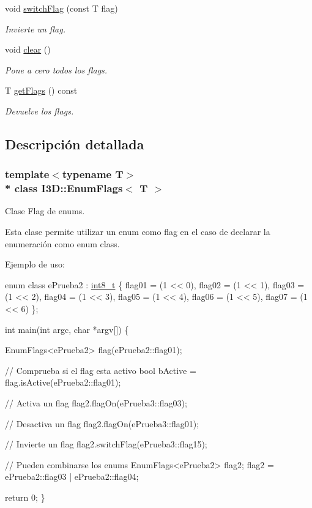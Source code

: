 \begin{DoxyCompactItemize}
void \hyperlink{class_i3_d_1_1_enum_flags_a8c834dc5942c140073152e281a86c71b}{switch\+Flag} (const T flag)
\begin{DoxyCompactList}\small\item\em Invierte un flag. \end{DoxyCompactList}\item 
void \hyperlink{class_i3_d_1_1_enum_flags_a1ed0ec6afaf6164c540f750329859bb6}{clear} ()
\begin{DoxyCompactList}\small\item\em Pone a cero todos los flags. \end{DoxyCompactList}\item 
T \hyperlink{class_i3_d_1_1_enum_flags_a6be92f1e3a8b65a3eaadfb729d1e3f77}{get\+Flags} () const 
\begin{DoxyCompactList}\small\item\em Devuelve los flags. \end{DoxyCompactList}\end{DoxyCompactItemize}


\subsection{Descripción detallada}
\subsubsection*{template$<$typename T$>$\\*
class I3\+D\+::\+Enum\+Flags$<$ T $>$}

Clase Flag de enums. 

Esta clase permite utilizar un enum como flag en el caso de declarar la enumeración como \textquotesingle{}enum class\textquotesingle{}.

Ejemplo de uso\+: 
\begin{DoxyCode}
\textcolor{keyword}{enum class} ePrueba2 : \hyperlink{defs_8h_aef44329758059c91c76d334e8fc09700}{int8\_t} \{
 flag01 = (1 << 0),
 flag02 = (1 << 1),
 flag03 = (1 << 2),
 flag04 = (1 << 3),
 flag05 = (1 << 4),
 flag06 = (1 << 5),
 flag07 = (1 << 6)
\};

\textcolor{keywordtype}{int} main(\textcolor{keywordtype}{int} argc, \textcolor{keywordtype}{char} *argv[])
\{

  EnumFlags<ePrueba2> flag(ePrueba2::flag01);

  \textcolor{comment}{// Comprueba si el flag esta activo}
  \textcolor{keywordtype}{bool} bActive = flag.isActive(ePrueba2::flag01);

  \textcolor{comment}{// Activa un flag}
  flag2.flagOn(ePrueba3::flag03);

  \textcolor{comment}{// Desactiva un flag}
  flag2.flagOn(ePrueba3::flag01);

  \textcolor{comment}{// Invierte un flag}
  flag2.switchFlag(ePrueba3::flag15);

  \textcolor{comment}{// Pueden combinarse los enums}
  EnumFlags<ePrueba2> flag2;
  flag2 = ePrueba2::flag03 | ePrueba2::flag04;

  \textcolor{keywordflow}{return} 0;
\}
\end{DoxyCode}
 

